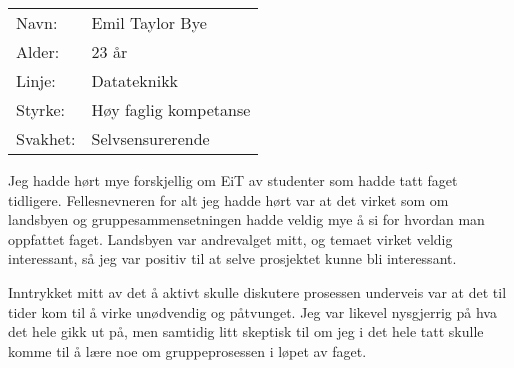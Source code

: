 \begin{table}[H]
    \begin{tabular}{l l}
        Navn: & Emil Taylor Bye\\
        Alder: & 23 år\\
        Linje: & Datateknikk\\
        Styrke: & Høy faglig kompetanse\\
        Svakhet: & Selvsensurerende
    \end{tabular}
\end{table}

Jeg hadde hørt mye forskjellig om EiT av studenter som hadde tatt faget tidligere.
Fellesnevneren for alt jeg hadde hørt var at det virket som om landsbyen og gruppesammensetningen hadde veldig mye å si for hvordan man oppfattet faget.
Landsbyen var andrevalget mitt, og temaet virket veldig interessant, så jeg var positiv til at selve prosjektet kunne bli interessant.

Inntrykket mitt av det å aktivt skulle diskutere prosessen underveis var at det til tider kom til å virke unødvendig og påtvunget.
Jeg var likevel nysgjerrig på hva det hele gikk ut på, men samtidig litt skeptisk til om jeg i det hele tatt skulle komme til å lære noe om gruppeprosessen i løpet av faget.
